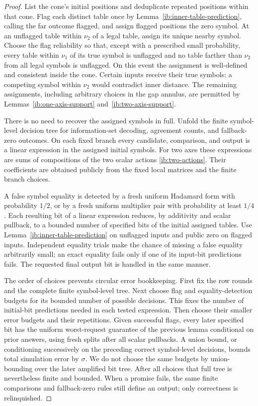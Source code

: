 \begin{proof}
List the cone's initial positions and deduplicate repeated positions
within that cone.  Flag each distinct table once by
Lemma~\ref{ib:inner-table-prediction}, calling the far outcome
flagged, and assign flagged positions the zero symbol.  At an
unflagged table within \(\nu_2\) of a legal table, assign its
unique nearby symbol.  Choose the flag reliability so that, except
with a prescribed small probability, every table within \(\nu_1\)
of its true symbol is unflagged and no table farther than \(\nu_2\)
from all legal symbols is unflagged.  On this event the assignment
is well-defined and consistent inside the cone.  Certain inputs
receive their true symbols: a competing symbol within \(\nu_2\)
would contradict inner distance.  The remaining assignments,
including arbitrary choices in the gap annulus, are permitted by
Lemmas~\ref{ib:one-axis-support} and~\ref{ib:two-axis-support}.

There is no need to recover the assigned symbols in full.  Unfold
the finite symbol-level decision tree for information-set decoding,
agreement counts, and fallback-zero outcomes.  On each fixed branch
every candidate, comparison, and output is a linear expression in
the assigned initial symbols.  For two axes these expressions are
sums of compositions of the two scalar actions
\eqref{ib:two-actions}.  Their coefficients are obtained publicly
from the fixed local matrices and the finite branch choices.

A false symbol equality is detected by a fresh uniform Hadamard
form with probability \(1/2\), or by a fresh uniform multiplier
pair with probability at least \(1/4\).  Each resulting bit of a
linear expression reduces, by additivity and scalar pullback, to
a bounded number of specified bits of the initial assigned tables.
Use Lemma~\ref{ib:inner-table-prediction} on unflagged inputs and
public zero on flagged inputs.  Independent equality trials make
the chance of missing a false equality arbitrarily small; an exact
equality fails only if one of its input-bit predictions fails.
The requested final output bit is handled in the same manner.

The order of choices prevents circular error bookkeeping.  First
fix the row rounds and the complete finite symbol-level tree.
Next choose flag and equality-detection budgets for its bounded
number of possible decisions.  This fixes the number of
initial-bit predictions needed in each tested expression.  Then
choose their smaller error budgets and their repetitions.  Given
successful flags, every later specified bit has the uniform
worst-request guarantee of the previous lemma conditional on prior
answers, using fresh splits after all scalar pullbacks.  A union
bound, or conditioning successively on the preceding correct
symbol-level decisions, bounds total simulation error by
\(\sigma\).  We do not choose the same budgets by union-bounding
over the later amplified bit tree.  After all choices that full
tree is nevertheless finite and bounded.  When a promise fails,
the same finite comparisons and fallback-zero rules still define
an output; only correctness is relinquished.
\end{proof}

